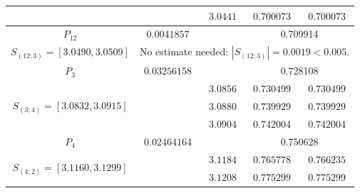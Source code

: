 \documentclass[10pt]{amsart}
\numberwithin{equation}{section}
\theoremstyle{definition}
\newcommand\intpx[2]{S_{(#1;#2)}}
\begin{document}
\begin{longtable}{|c|c|c|c|c|}
  &  &  $3.0441 $  &  $ 0.700073 $ & $ 0.700073 $ \\
   \hline 
       $P_{12}$ &  $0.0041857$  &  & \multicolumn{2}{c|}{0.709914}  \\
  \hline
  $ \intpx{12}{3} =  [3.0490,3.0509] $  & \multicolumn{4}{c|}{No estimate needed:
  $|\intpx{12}{3}| = 0.0019 < 0.005$. \phantom{\Large $R_{1}^2$} } \\
  \hline
       $P_3$ & $0.03256158$ & & \multicolumn{2}{c|}{0.728108}  \\
  \hline
  \multirow{3}{*}{ $ \intpx{3}{4}  =  [3.0832,3.0915]  $ } 
  &  &  $3.0856 $  &  $ 0.730499 $ & $ 0.730499 $ \\
  &  &  $3.0880 $  &  $ 0.739929 $ & $ 0.739929 $ \\
  &  &  $3.0904 $  &  $ 0.742004 $ & $ 0.742004 $ \\
  \hline
          $P_4$  & $0.02464164$ & & \multicolumn{2}{c|}{0.750628} \\
  \hline
  \multirow{5}{*}{ $ \intpx{4}{2} = [3.1160,3.1299]$ } 
  &  &  $3.1184 $  &  $ 0.765778 $ & $ 0.766235 $ \\
  &  &  $3.1208 $  &  $ 0.775299 $ & $ 0.775299 $ \\

\end{longtable}
\end{document}
